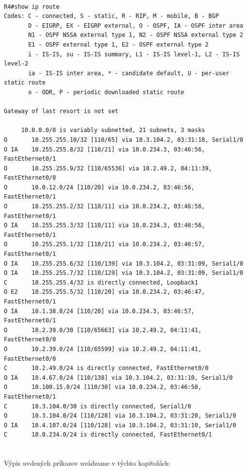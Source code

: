 \documentclass[12pt,twoside,a4paper]{report}
\begin{document}
\noindent
{\selectfont
\begin{small}
\begin{verbatim}

R4#show ip route
Codes: C - connected, S - static, R - RIP, M - mobile, B - BGP
       D - EIGRP, EX - EIGRP external, O - OSPF, IA - OSPF inter area 
       N1 - OSPF NSSA external type 1, N2 - OSPF NSSA external type 2
       E1 - OSPF external type 1, E2 - OSPF external type 2
       i - IS-IS, su - IS-IS summary, L1 - IS-IS level-1, L2 - IS-IS level-2
       ia - IS-IS inter area, * - candidate default, U - per-user static route
       o - ODR, P - periodic downloaded static route

Gateway of last resort is not set

     10.0.0.0/8 is variably subnetted, 21 subnets, 3 masks
O       10.255.255.10/32 [110/65] via 10.3.104.2, 03:31:18, Serial1/0
O IA    10.255.255.8/32 [110/21] via 10.0.234.3, 03:46:56, FastEthernet0/1
O       10.255.255.9/32 [110/65536] via 10.2.49.2, 04:11:39, FastEthernet0/0
O       10.0.12.0/24 [110/20] via 10.0.234.2, 03:46:56, FastEthernet0/1
O       10.255.255.2/32 [110/11] via 10.0.234.2, 03:46:56, FastEthernet0/1
O IA    10.255.255.3/32 [110/11] via 10.0.234.3, 03:46:56, FastEthernet0/1
O       10.255.255.1/32 [110/21] via 10.0.234.2, 03:46:57, FastEthernet0/1
O IA    10.255.255.6/32 [110/139] via 10.3.104.2, 03:31:09, Serial1/0
O IA    10.255.255.7/32 [110/129] via 10.3.104.2, 03:31:09, Serial1/0
C       10.255.255.4/32 is directly connected, Loopback1
O E2    10.255.255.5/32 [110/20] via 10.0.234.2, 03:46:47, FastEthernet0/1
O IA    10.1.38.0/24 [110/20] via 10.0.234.3, 03:46:57, FastEthernet0/1
O       10.2.39.0/30 [110/65663] via 10.2.49.2, 04:11:41, FastEthernet0/0
O       10.2.39.0/24 [110/65599] via 10.2.49.2, 04:11:41, FastEthernet0/0
C       10.2.49.0/24 is directly connected, FastEthernet0/0
O IA    10.4.67.0/24 [110/138] via 10.3.104.2, 03:31:10, Serial1/0
O       10.100.15.0/24 [110/30] via 10.0.234.2, 03:46:58, FastEthernet0/1
C       10.3.104.0/30 is directly connected, Serial1/0
O       10.3.104.0/24 [110/128] via 10.3.104.2, 03:31:20, Serial1/0
O IA    10.4.107.0/24 [110/128] via 10.3.104.2, 03:31:10, Serial1/0
C       10.0.234.0/24 is directly connected, FastEthernet0/1


\end{verbatim}
\end{small}
}

\paragraph{}
Výpis uvdených príkazov uvádzame v týchto kapitolách:
\end{document}
